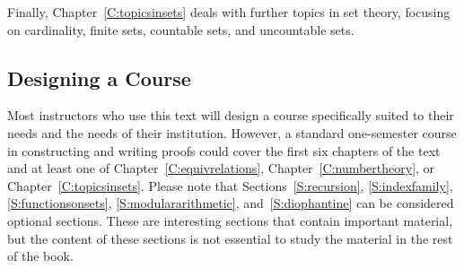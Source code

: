 Finally, Chapter~\ref{C:topicsinsets} deals with further topics in set theory, focusing on cardinality, finite sets, countable sets, and uncountable sets.

\subsection*{Designing a Course}
Most instructors who use this text will design a course specifically suited to their needs and the needs of their institution.  However, a standard one-semester course in constructing and writing proofs could cover the first six chapters of the text and at least one of Chapter~\ref{C:equivrelations}, Chapter~\ref{C:numbertheory}, or Chapter~\ref{C:topicsinsets}.  Please note that Sections~\ref{S:recursion}, \ref{S:indexfamily}, \ref{S:functionsonsets}, \ref{S:modulararithmetic}, 
and~\ref{S:diophantine} can be considered optional sections.  These are interesting sections that contain important material, but the content of these sections is not essential  to study the material in the rest of the book.  

%
%


